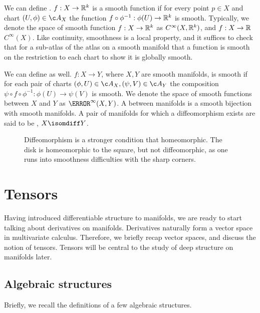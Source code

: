 We can define .
\(f: X\to \mathbb{R}^k\) is a smooth function if for every point \(p \in X\) and chart \((U, \phi) \in \atlas{X}\) the function \(f \circ \phi^{-1}: \phi(U)\to \mathbb{R}^k\) is smooth.
Typically, we denote the space of smooth function \(f: X\to \mathbb{R}^k\) as \(C^\infty(X, \mathbb{R}^k)\), and \(f: X\to \mathbb{R}\) \(C^\infty(X)\).
Like continuity, smoothness is a local property, and it suffices to check that for a sub-atlas of the atlas on a smooth manifold that a function is smooth on the restriction to each chart to show it is globally smooth.

We can define  as well.
\(f: X \to Y\), where \(X, Y\) are smooth manifolds, is smooth if for each pair of charts \((\phi, U)\in \atlas{X}, (\psi, V) \in \atlas{Y}\) the composition \(\psi \circ f \circ \phi^{-1}: \phi(U)\to \psi(V)\) is smooth.
We denote the space of smooth functions between \(X\) and \(Y\) as \(\C^\infty(X, Y)\).
A  between manifolds is a smooth bijection with smooth manifolds.
A pair of manifolds for which a diffeomorphism exists are said to be , \(X \isomdiff Y\).

\begin{figure}[h]
	
	\caption{Diffeomorphism is a stronger condition that homeomorphic.
		The disk is homeomorphic to the square, but not diffeomorphic, as one runs into smoothness difficulties with the sharp corners.
	}
\end{figure}

\section{Tensors}
\label{sec:tensors}
Having introduced differentiable structure to manifolds, we are ready to start talking about derivatives on manifolds.
Derivatives naturally form a vector space in multivariate calculus.
Therefore, we briefly recap vector spaces, and discuss the notion of tensors.
Tensors will be central to the study of deep structure on manifolds later.

\subsection{Algebraic structures}

Briefly, we recall the definitions of a few algebraic structures.

